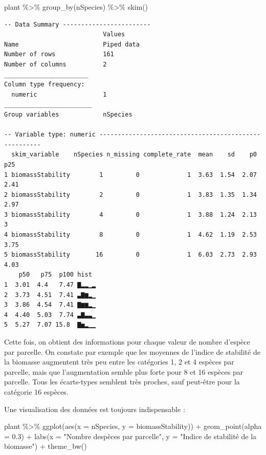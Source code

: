 \documentclass[
  a4paper,
]{article}
\newenvironment{Shaded}{\begin{snugshade}}{\end{snugshade}}
\newcommand{\AttributeTok}[1]{\textcolor[rgb]{0.00,0.34,0.68}{#1}}
\newcommand{\FloatTok}[1]{\textcolor[rgb]{0.69,0.50,0.00}{#1}}
\newcommand{\FunctionTok}[1]{\textcolor[rgb]{0.39,0.29,0.61}{#1}}
\newcommand{\NormalTok}[1]{\textcolor[rgb]{0.12,0.11,0.11}{#1}}
\newcommand{\SpecialCharTok}[1]{\textcolor[rgb]{0.24,0.68,0.91}{#1}}
\newcommand{\StringTok}[1]{\textcolor[rgb]{0.75,0.01,0.01}{#1}}
\begin{document}
\begin{Shaded}
\begin{Highlighting}[]
\NormalTok{plant }\SpecialCharTok{\%\textgreater{}\%} 
  \FunctionTok{group\_by}\NormalTok{(nSpecies) }\SpecialCharTok{\%\textgreater{}\%} 
  \FunctionTok{skim}\NormalTok{()}
\end{Highlighting}
\end{Shaded}

\begin{verbatim}
-- Data Summary ------------------------
                           Values    
Name                       Piped data
Number of rows             161       
Number of columns          2         
_______________________              
Column type frequency:               
  numeric                  1         
________________________             
Group variables            nSpecies  

-- Variable type: numeric ------------------------------------------------------
  skim_variable    nSpecies n_missing complete_rate  mean    sd    p0   p25
1 biomassStability        1         0             1  3.63  1.54  2.07  2.41
2 biomassStability        2         0             1  3.83  1.35  1.34  2.97
3 biomassStability        4         0             1  3.88  1.24  2.13  3   
4 biomassStability        8         0             1  4.62  1.19  2.53  3.75
5 biomassStability       16         0             1  6.03  2.73  2.93  4.03
    p50   p75  p100 hist 
1  3.01  4.4   7.47 ▇▂▂▁▂
2  3.73  4.51  7.41 ▃▇▆▂▁
3  3.86  4.54  7.41 ▇▆▆▂▁
4  4.40  5.03  7.74 ▃▇▃▃▁
5  5.27  7.07 15.8  ▇▅▂▁▁
\end{verbatim}

Cette fois, on obtient des informations pour chaque valeur de nombre d'espèce par parcelle. On constate par exemple que les moyennes de l'indice de stabilité de la biomasse augmentent très peu entre les catégories 1, 2 et 4 espèces par parcelle, mais que l'augmentation semble plus forte pour 8 et 16 espèces par parcelle. Tous les écarts-types semblent très proches, sauf peut-être pour la catégorie 16 espèces.

Une visualisation des données est toujours indispensable :

\begin{Shaded}
\begin{Highlighting}[]
\NormalTok{plant }\SpecialCharTok{\%\textgreater{}\%} 
  \FunctionTok{ggplot}\NormalTok{(}\FunctionTok{aes}\NormalTok{(}\AttributeTok{x =}\NormalTok{ nSpecies, }\AttributeTok{y =}\NormalTok{ biomassStability)) }\SpecialCharTok{+}
  \FunctionTok{geom\_point}\NormalTok{(}\AttributeTok{alpha =} \FloatTok{0.3}\NormalTok{) }\SpecialCharTok{+}
  \FunctionTok{labs}\NormalTok{(}\AttributeTok{x =} \StringTok{"Nombre d\textquotesingle{}espèces par parcelle"}\NormalTok{,}
       \AttributeTok{y =} \StringTok{"Indice de stabilité de la biomasse"}\NormalTok{) }\SpecialCharTok{+}
  \FunctionTok{theme\_bw}\NormalTok{()}
\end{Highlighting}
\end{Shaded}
\end{document}
